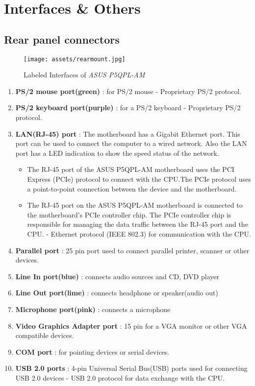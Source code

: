 \chapter{Interfaces \& Others}\label{ch:interfaces}

\section{Rear panel connectors}
\begin{figure}[H]
\begin{center}
\texttt{[image: assets/rearmount.jpg]}
\caption{Labeled Interfaces of \emph{ASUS P5QPL-AM}} \label{fig:using:samplepngImage}
\end{center}
\end{figure}
\begin{enumerate}
    \item \textbf{PS/2 mouse port(green)} : for PS/2 mouse -  Proprietary PS/2 protocol.
    \item \textbf{PS/2 keyboard port(purple)} : for a PS/2 keyboard -  Proprietary PS/2 protocol.
    \item \textbf{LAN(RJ-45) port} : The motherboard has a Gigabit Ethernet port. This port can be used to connect the computer to a wired network. Also the LAN port has a LED indication to show the speed status of the network.
    \begin{itemize}
        \item The RJ-45 port of the ASUS P5QPL-AM motherboard uses the PCI Express (PCIe) protocol to connect with the CPU.The PCIe protocol uses a point-to-point connection between the device and the motherboard.
        \item The RJ-45 port on the ASUS P5QPL-AM motherboard is connected to the motherboard's PCIe controller chip. The PCIe controller chip is responsible for managing the data traffic between the RJ-45 port and the CPU. - Ethernet protocol (IEEE 802.3) for communication with the CPU.
    \end{itemize}
        
    \item \textbf{Parallel port} : 25 pin port used to connect parallel printer, scanner or other devices.
    \item \textbf{Line In port(blue)} : connects audio sources and CD, DVD player
    \item \textbf{Line Out port(lime)} : connects headphone or speaker(audio out)
    \item \textbf{Microphone port(pink)} : connects a microphone
    \item \textbf{Video Graphics Adapter port} : 15 pin for a VGA monitor or other VGA compatible devices.
    \item \textbf{COM port} : for pointing devices or serial devices.
    \item \textbf{USB 2.0 ports} : 4-pin Universal Serial Bus(USB) ports used for connecting USB 2.0 devices - USB 2.0 protocol for data exchange with the CPU.
\end{enumerate}

